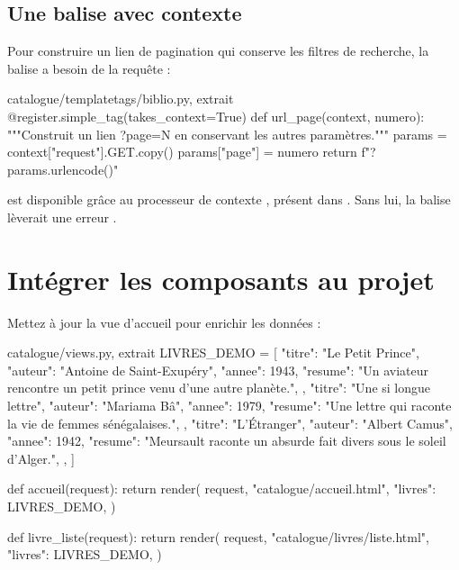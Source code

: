\subsection{Une balise avec contexte}

Pour construire un lien de pagination qui conserve les filtres de recherche, la
balise a besoin de la requête :

\begin{codebox}[python]{catalogue/templatetags/biblio.py, extrait}
@register.simple_tag(takes_context=True)
def url_page(context, numero):
    """Construit un lien ?page=N en conservant les autres paramètres."""
    params = context["request"].GET.copy()
    params["page"] = numero
    return f"?{params.urlencode()}"
\end{codebox}


\begin{note}
 est disponible grâce au processeur de contexte
, présent dans
. Sans lui, la balise lèverait une erreur
.
\end{note}

\section{Intégrer les composants au projet}

Mettez à jour la vue d'accueil pour enrichir les données :

\begin{codebox}[python]{catalogue/views.py, extrait}
LIVRES_DEMO = [
    {
        "titre": "Le Petit Prince",
        "auteur": "Antoine de Saint-Exupéry",
        "annee": 1943,
        "resume": "Un aviateur rencontre un petit prince venu d'une autre planète.",
    },
    {
        "titre": "Une si longue lettre",
        "auteur": "Mariama Bâ",
        "annee": 1979,
        "resume": "Une lettre qui raconte la vie de femmes sénégalaises.",
    },
    {
        "titre": "L'Étranger",
        "auteur": "Albert Camus",
        "annee": 1942,
        "resume": "Meursault raconte un absurde fait divers sous le soleil d'Alger.",
    },
]


def accueil(request):
    return render(
        request,
        "catalogue/accueil.html",
        {"livres": LIVRES_DEMO},
    )


def livre_liste(request):
    return render(
        request,
        "catalogue/livres/liste.html",
        {"livres": LIVRES_DEMO},
    )
\end{codebox}

